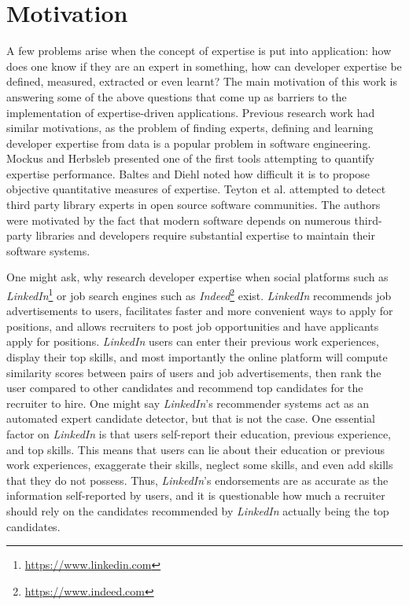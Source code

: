     \section{Motivation\label{sec:motivation}}
        A few problems arise when the concept of expertise is put into application: how does one know if they are an expert in something, how can developer expertise be defined, measured, extracted or even learnt? The main motivation of this work is answering some of the above questions that come up as barriers to the implementation of expertise-driven applications. Previous research work had similar motivations, as the problem of finding experts, defining and learning developer expertise from data is a popular problem in software engineering. Mockus and Herbsleb \cite{mockus2002expertise} presented one of the first tools attempting to quantify expertise performance. Baltes and Diehl \cite{baltes2018towards} noted how difficult it is to propose objective quantitative measures of expertise. Teyton et al. \cite{teyton2013find} attempted to detect third party library experts in open source software communities. The authors were motivated by the fact that modern software depends on numerous third-party libraries and developers require substantial expertise to maintain their software systems.
        
        \label{LinkedIn_flaws}One might ask, why research developer expertise when social platforms such as \emph{LinkedIn}\footnote{\url{https://www.linkedin.com}} or job search engines such as \emph{Indeed}\footnote{\url{https://www.indeed.com}} exist. \emph{LinkedIn} recommends job advertisements to users, facilitates faster and more convenient ways to apply for positions, and allows recruiters to post job opportunities and have applicants apply for positions. \emph{LinkedIn} users can enter their previous work experiences, display their top skills, and most importantly the online platform will compute similarity scores between pairs of users and job advertisements, then rank the user compared to other candidates and recommend top candidates for the recruiter to hire. One might say \emph{LinkedIn}'s recommender systems act as an automated expert candidate detector, but that is not the case. One essential factor on \emph{LinkedIn} is that users self-report their education, previous experience, and top skills. This means that users can lie about their education or previous work experiences, exaggerate their skills, neglect some skills, and even add skills that they do not possess. Thus, \emph{LinkedIn}'s endorsements are as accurate as the information self-reported by users, and it is questionable how much a recruiter should rely on the candidates recommended by \emph{LinkedIn} actually being the top candidates.
        
